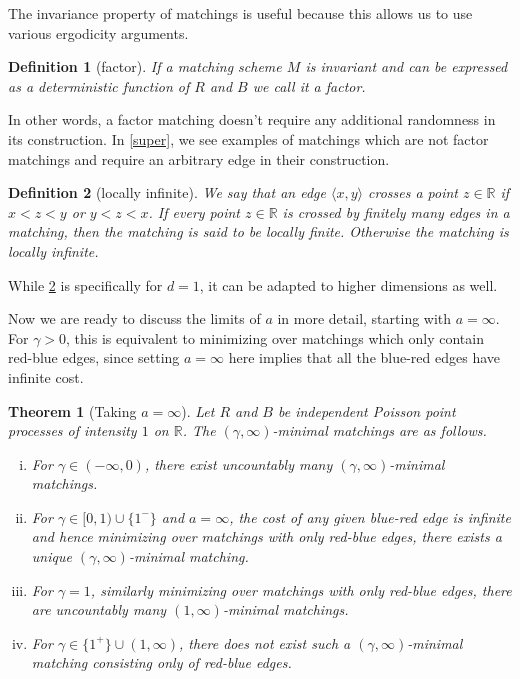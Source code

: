 \documentclass{article}
\newtheorem{theorem}{Theorem}[section]
\newtheorem{definition}{Definition}
\newcommand{\R}{\mathbb{R}}
\begin{document}
The invariance property of matchings is useful because this allows us to use
various ergodicity arguments.

\begin{definition}[factor]
  If a matching scheme $M$ is invariant and can be expressed as a
  deterministic function of $R$ and $B$ we call it a factor.
\end{definition}

In other words, a factor matching doesn't require any additional
randomness in its construction. In \cref{super}, we see examples
of matchings which are not factor matchings and require an arbitrary
edge in their construction.


\begin{definition}[locally infinite] \label{def:locinf}
We say that an edge $\langle x,y \rangle$ crosses a point
$z\in\mathbb{R}$ if $x<z<y$ or $y<z<x$. If every point $z\in\mathbb{R}$ is
crossed by finitely many edges in
a matching, then the matching is said to be locally finite. Otherwise
the matching is locally infinite.
\end{definition}

While \cref{def:locinf}   is specifically for $d=1$, it can be
adapted to higher dimensions as well.

Now we are ready to discuss the limits of $a$ in more detail, starting
with  $a=\infty$. For $\gamma>0$, this is equivalent to minimizing over matchings
which only contain red-blue edges, since setting $a=\infty$ here
implies that all the blue-red edges have infinite cost.


\begin{samepage}
\begin{theorem}[Taking $a=\infty$]\label{thm:a-infty}
  Let $R$ and $B$ be independent Poisson point processes of intensity
  $1$ on $\R$.
  The $(\gamma,\infty)$-minimal matchings are as follows.
  \begin{enumerate}[(i)]
  \item For $\gamma\in (-\infty,0)$, there exist uncountably many
    $(\gamma,\infty)$-minimal matchings.
  \item For $\gamma\in[0,1)\cup\{1^-\}
    $ and $a=\infty$, the cost of any given
    blue-red
    edge is infinite and hence minimizing over matchings with only
    red-blue edges, there exists a unique
    $(\gamma,\infty)$-minimal matching.
  \item For $\gamma=1$, similarly minimizing over matchings with only
  red-blue edges, there are uncountably many $(1,\infty)$-minimal matchings.
  \item For $\gamma\in\{1^+\}\cup(1,\infty)$, there does not exist such a
  $(\gamma,\infty)$-minimal matching consisting only of red-blue edges.
  \end{enumerate}
\end{theorem}
\end{samepage}
\end{document}
